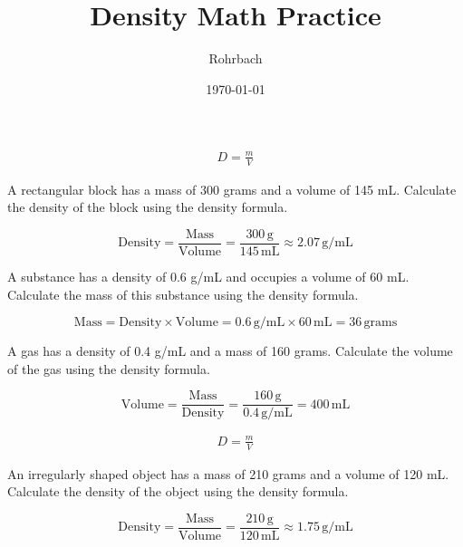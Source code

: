 \documentclass[10pt]{exam}
\title{Density Math Practice}
\author{Rohrbach}
\date{\today}
\begin{document}
\maketitle

\begin{align*}
  D=\frac{m}{V}
\end{align*}

\begin{questions}

  \question
  A rectangular block has a mass of 300 grams and a volume of 145 mL. Calculate the density of the block using the density formula.

  \ku
  
  \begin{solution}
  \[
  \text{Density} = \frac{\text{Mass}}{\text{Volume}} = \frac{300 \, \text{g}}{145 \, \text{mL}} \approx 2.07 \, \text{g/mL}
  \]
  \end{solution}
  
  \question
  A substance has a density of 0.6 g/mL and occupies a volume of 60 mL. Calculate the mass of this substance using the density formula.

  \ku
  
  \begin{solution}
  \[
  \text{Mass} = \text{Density} \times \text{Volume} = 0.6 \, \text{g/mL} \times 60 \, \text{mL} = 36 \, \text{grams}
  \]
  \end{solution}
  
  \question
  A gas has a density of 0.4 g/mL and a mass of 160 grams. Calculate the volume of the gas using the density formula.

  \ku
  
  \begin{solution}
  \[
  \text{Volume} = \frac{\text{Mass}}{\text{Density}} = \frac{160 \, \text{g}}{0.4 \, \text{g/mL}} = 400 \, \text{mL}
  \]
  \end{solution}


  \pagebreak
  
  \begin{align*}
    D=\frac{m}{V}
  \end{align*}

  \question
  An irregularly shaped object has a mass of 210 grams and a volume of 120 mL. Calculate the density of the object using the density formula.

  \ku
  
  \begin{solution}
  \[
  \text{Density} = \frac{\text{Mass}}{\text{Volume}} = \frac{210 \, \text{g}}{120 \, \text{mL}} \approx 1.75 \, \text{g/mL}
  \]
  \end{solution}
  

\end{questions}
\end{document}

